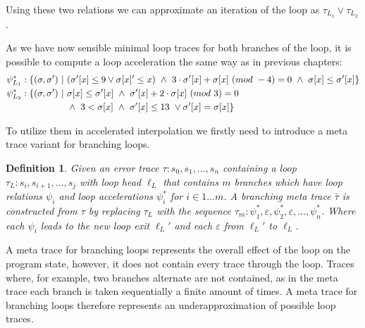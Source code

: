 \documentclass{article}
\newcounter{example}[section]
\newtheorem{mydef}{Definition}
\begin{document}
Using these two relations we can approximate an iteration of the loop as $\tau_{L_1} \lor \tau_{L_2}$. \\ \par
As we have now sensible minimal loop traces for both branches of the loop, it is possible to compute a loop acceleration the same way as in previous chapters:
\begin{align*}
    \psi_{L_{1}}^* &: \{(\sigma, \sigma')\ |\ (\sigma'[x] \leq 9 \lor \sigma[x]' \leq x)\ \land\ 3\cdot \sigma'[x] + \sigma[x]\ (mod\ -4) = 0\ \land\ \sigma[x] \leq \sigma'[x] \} \\
    \psi_{L_{2}}^* &: \{ (\sigma, \sigma')\ | \ \sigma[x] \leq \sigma'[x]\ \land\ \sigma'[x] + 2 \cdot \sigma[x]\ (mod\ 3) = 0 \\
    &\hspace*{1.75cm} \land\ 3 < \sigma[x]\ \land\ \sigma'[x] \leq 13 \ \lor \sigma'[x] = \sigma[x]\}
\end{align*}

To utilize them in accelerated interpolation we firstly need to introduce a meta trace variant for branching loops.

\begin{mydef}
    Given an error trace $\tau: s_0, s_1, \ldots, s_n$ containing a loop $\tau_L: s_i, s_{i+1}, \ldots, s_j$ with loop head $\ell_L$ that contains $m$ branches which have loop relations $\psi_i$ and loop accelerations $\psi_i^*$ for $i \in 1 \ldots m$. A branching meta trace $\bar{\tau}$ is constructed from $\tau$ by replacing $\tau_L$ with the sequence $\tau_m: \psi_1^*, \varepsilon, \psi_2^*, \varepsilon, \ldots, \psi_n^* $. Where each $\psi_i$ leads to the new loop exit $\ell_L'$ and each $\varepsilon$ from $\ell_L'$ to $\ell_L$.
\end{mydef}
 A meta trace for branching loops represents the overall effect of the loop on the program state, however, it does not contain every trace through the loop. Traces where, for example, two branches alternate are not contained, as in the meta trace each branch is taken sequentially a finite amount of times. A meta trace for branching loops therefore represents an underapproximation of possible loop traces. \\ \par
\end{document}
